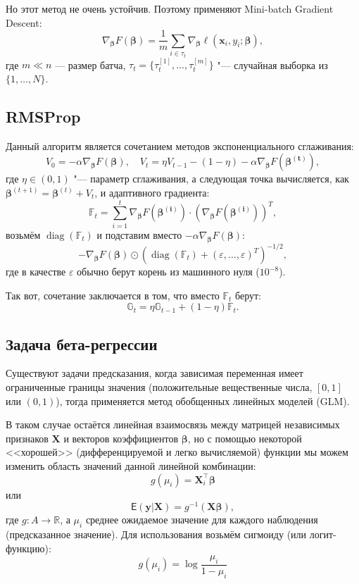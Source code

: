 \documentclass[12pt]{article}
\begin{document}
	Но этот метод не очень устойчив. Поэтому применяют Mini-batch Gradient Descent: \[
	\nabla_{\boldsymbol{\beta}} F(\boldsymbol{\beta}) = \frac{1}{m} \sum_{i \in \tau _t} \nabla_{\boldsymbol{\beta}} \ell(\mathbf{x}_i, y_i; \boldsymbol{\beta}),
	\]
	где $ m \ll n $ — размер батча, $\tau _t = \{\tau ^{[1]} _t, \dots, \tau ^{[m]} _t\}$ "--- случайная выборка из $\{1, \dots, N\}$.
	
	\subsection{RMSProp}
	
	Данный алгоритм является сочетанием методов экспоненциального сглаживания:
	\[
	V _0 = -\alpha \nabla_{\boldsymbol{\beta}} F(\boldsymbol{\beta}), \quad V _t = \eta V _{t - 1} - (1 - \eta) -\alpha \nabla_{\boldsymbol{\beta}} F(\boldsymbol{\beta ^{(t)}}),
	\]
	где $\eta \in (0, 1)$ "--- параметр сглаживания, а следующая точка вычисляется, как $\boldsymbol{\beta}^{(t+1)} = \boldsymbol{\beta}^{(t)} + V _t$, и адаптивного градиента:
	\[
	\mathbb{F} _t = \sum ^t _{i = 1} \nabla_{\boldsymbol{\beta}} F(\boldsymbol{\beta ^{(i)}}) \cdot \left(\nabla_{\boldsymbol{\beta}} F(\boldsymbol{\beta ^{(i)}})\right) ^T,
	\]
	возьмём $\operatorname*{diag}(\mathbb{F} _t)$ и подставим вместо $-\alpha \nabla_{\boldsymbol{\beta}} F(\boldsymbol{\beta})$:
	\[
	- \nabla_{\boldsymbol{\beta}} F(\boldsymbol{\beta}) \odot \left(\operatorname*{diag}(\mathbb{F} _t) + (\varepsilon, \dots, \varepsilon) ^T\right) ^{- 1 / 2},
	\]
	где в качестве $\varepsilon$ обычно берут корень из машинного нуля ($10 ^{-8}$).
	
	Так вот, сочетание заключается в том, что вместо $\mathbb{F} _t$ берут:
	\[
	\mathbb{G} _t = \eta \mathbb{G} _{t - 1} + (1 - \eta) \mathbb{F} _t.
	\]
	
	\subsection{Задача бета-регрессии}
	
	Существуют задачи предсказания, когда зависимая переменная имеет ограниченные границы значения (положительные вещественные числа, $[0, 1]$ или $(0, 1)$), тогда применяется метод обобщенных линейных моделей (GLM).
	
	В таком случае остаётся линейная взаимосвязь между матрицей независимых признаков $\mathbf{X}$ и векторов коэффициентов $\boldsymbol{\beta}$, но с помощью некоторой <<хорошей>> (дифференцируемой и легко вычисляемой) функции мы можем изменить область значений данной линейной комбинации:
	\[
	g(\mu_i) = \mathbf{X}_i^\top \boldsymbol{\beta}
	\]
	или
	\[
	\mathsf{E} (\mathbf{y}|\mathbf{X}) = g ^{-1} (\mathbf{X} \boldsymbol{\beta}),
	\]
	где $g: A \to \mathbb{R}$, а $\mu _i$ среднее ожидаемое значение для каждого наблюдения (предсказанное значение). Для использования возьмём сигмоиду (или логит-функцию):
	\[
	g(\mu_i) = \log \frac{\mu_i}{1 - \mu_i}
	\]
	
\end{document}
